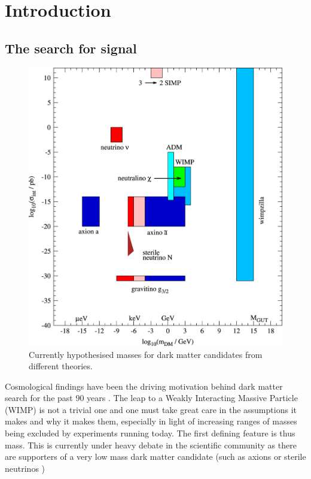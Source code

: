 \documentclass[11pt]{article} %
\begin{document}
\pagebreak
\section{Introduction}
\subsection{The search for signal}
\begin{figure}[H]
\centering
\includegraphics[scale=1]{images/mass_ranges.jpg}
\caption{\cite{BAER20151} Currently hypothesised masses for dark matter candidates from different theories.}
\label{fig:mass_ranges}
\end{figure}
\par Cosmological findings have been the driving motivation behind dark matter search for the past 90 years \cite{bertone2018history}.
The leap to a Weakly Interacting Massive Particle (WIMP) \cite{steigman1984cosmological} is not a trivial one and one must take great care in the assumptions \cite{scherrer1986relic}
it makes and why it makes them, especially in light of increasing ranges of masses being excluded by experiments running today.
The first defining feature is thus mass.
This is currently under heavy debate in the scientific community as there are supporters of a very low mass dark matter candidate (such as axions \cite{weinberg1978new} or sterile neutrinos \cite{kusenko2009sterile})
\end{document}
